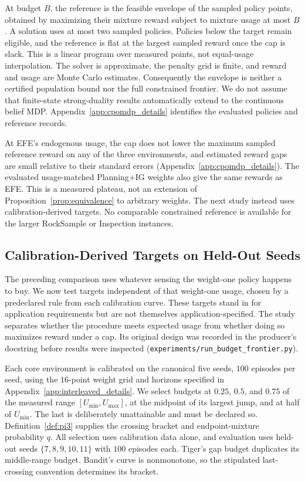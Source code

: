 \documentclass[manuscript, screen, review]{jair}
\begin{document}
At budget $B$, the reference is the feasible envelope of the sampled policy points, obtained by maximizing their mixture reward subject to mixture usage at most $B$. A solution uses at most two sampled policies. Policies below the target remain eligible, and the reference is flat at the largest sampled reward once the cap is slack. This is a linear program over measured points, not equal-usage interpolation. The solver is approximate, the penalty grid is finite, and reward and usage are Monte Carlo estimates. Consequently the envelope is neither a certified population bound nor the full constrained frontier. We do not assume that finite-state strong-duality results \citep{altman1999} automatically extend to the continuous belief MDP. Appendix~\ref{app:cpomdp_details} identifies the evaluated policies and reference records.

At EFE's endogenous usage, the cap does not lower the maximum sampled reference reward on any of the three environments, and estimated reward gaps are small relative to their standard errors (Appendix~\ref{app:cpomdp_details}). The evaluated usage-matched Planning+IG weights also give the same rewards as EFE. This is a measured plateau, not an extension of Proposition~\ref{prop:equivalence} to arbitrary weights. The next study instead uses calibration-derived targets. No comparable constrained reference is available for the larger RockSample or Inspection instances.

\subsection{Calibration-Derived Targets on Held-Out Seeds}
\label{sec:budget_frontier}

The preceding comparison uses whatever sensing the weight-one policy happens to buy. We now test targets independent of that weight-one usage, chosen by a predeclared rule from each calibration curve. These targets stand in for application requirements but are not themselves application-specified. The study separates whether the procedure meets expected usage from whether doing so maximizes reward under a cap. Its original design was recorded in the producer's docstring before results were inspected (\texttt{experiments/\allowbreak run\_\allowbreak budget\_\allowbreak frontier.py}).

Each core environment is calibrated on the canonical five seeds, $100$ episodes per seed, using the $16$-point weight grid and horizons specified in Appendix~\ref{app:interleaved_details}. We select budgets at $0.25$, $0.5$, and $0.75$ of the measured range $[U_{\min},U_{\max}]$, at the midpoint of its largest jump, and at half of $U_{\min}$. The last is deliberately unattainable and must be declared so. Definition~\ref{def:pi3} supplies the crossing bracket and endpoint-mixture probability $q$. All selection uses calibration data alone, and evaluation uses held-out seeds $\{7,8,9,10,11\}$ with $100$ episodes each. Tiger's gap budget duplicates its middle-range budget. Bandit's curve is nonmonotone, so the stipulated last-crossing convention determines its bracket.
\end{document}
